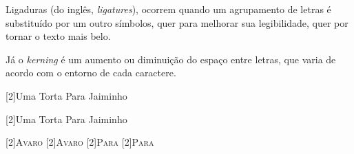 Ligaduras (do inglês, \emph{ligatures}), ocorrem quando um agrupamento
de letras é substituído por um outro símbolos, quer para melhorar sua
legibilidade, quer por tornar o texto mais belo.

Já o \emph{kerning} é um aumento ou diminuição do espaço entre letras,
que varia de acordo com o entorno de cada caractere.

\medskip
\noindent\begin{center}%
\scalebox{2}[2]{Uma {T}orta {P}ara {J}aiminho}

\scalebox{2}[2]{Uma Torta Para Jaiminho}

\medskip

\scalebox{2}[2]{\textsc{{A}varo}}\hfil%
\scalebox{2}[2]{\textsc{Avaro}}%
\hfil\scalebox{2}[2]{\textsc{{P}ara}}
\hfil\scalebox{2}[2]{\textsc{Para}}\hfil
\end{center}

\begin{comment}
  (breve) história do TeX, do LaTeX e irmãos
  Resumo de como o sistema ``monta'' as páginas
\end{comment}



